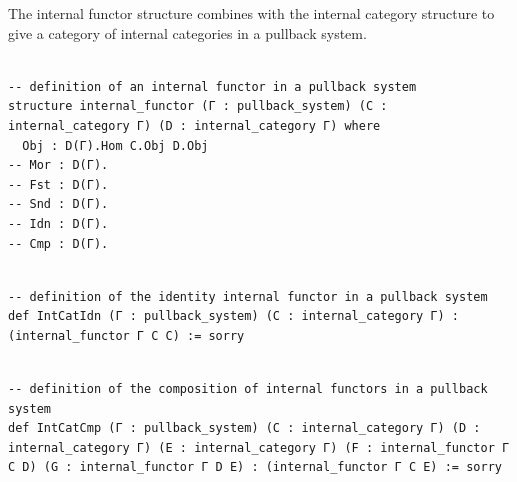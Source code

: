 \documentclass{book}
\theoremstyle{definition}
\newcounter{lcounter}
\begin{document}
The internal functor structure combines with the internal category structure to give a category of internal categories in a pullback system.\\

\begin{center}
\begin{tcolorbox}[width=5in,colback={white},title={\begin{center}\texttt{Lean \thelcounter} \addtocounter{lcounter}{1}  \end{center}},colbacktitle=Blue,coltitle=black]
\begin{verbatim}

-- definition of an internal functor in a pullback system
structure internal_functor (Γ : pullback_system) (C : internal_category Γ) (D : internal_category Γ) where
  Obj : D(Γ).Hom C.Obj D.Obj
-- Mor : D(Γ).
-- Fst : D(Γ).
-- Snd : D(Γ).
-- Idn : D(Γ).
-- Cmp : D(Γ).

\end{verbatim}
\end{tcolorbox}
\end{center}


\begin{center}
\begin{tcolorbox}[width=5in,colback={white},title={\begin{center}\texttt{Lean \thelcounter} \addtocounter{lcounter}{1}  \end{center}},colbacktitle=Blue,coltitle=black]
\begin{verbatim}

-- definition of the identity internal functor in a pullback system
def IntCatIdn (Γ : pullback_system) (C : internal_category Γ) : (internal_functor Γ C C) := sorry

\end{verbatim}
\end{tcolorbox}
\end{center}

\begin{center}
\begin{tcolorbox}[width=5in,colback={white},title={\begin{center}\texttt{Lean \thelcounter} \addtocounter{lcounter}{1}  \end{center}},colbacktitle=Blue,coltitle=black]
\begin{verbatim}

-- definition of the composition of internal functors in a pullback system
def IntCatCmp (Γ : pullback_system) (C : internal_category Γ) (D : internal_category Γ) (E : internal_category Γ) (F : internal_functor Γ C D) (G : internal_functor Γ D E) : (internal_functor Γ C E) := sorry

\end{verbatim}
\end{tcolorbox}
\end{center}
\end{document}
